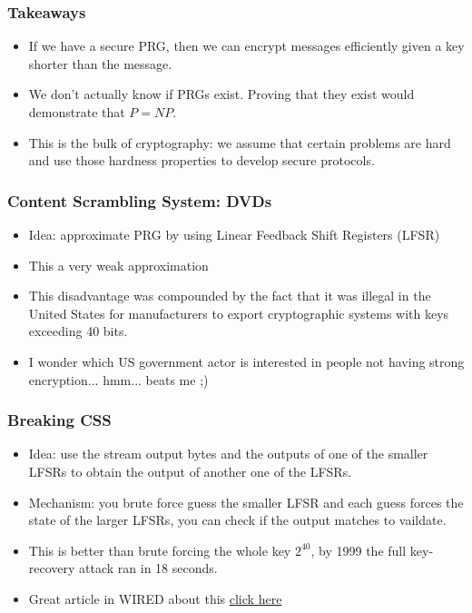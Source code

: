 \documentclass{beamer}
\begin{document}
\begin{frame}
\frametitle{Takeaways}
\begin{itemize}
    \item If we have a secure PRG, then we can encrypt messages efficiently given a key shorter than the message. \pause
    \item We don't actually know if PRGs exist. Proving that they exist would demonstrate that \(P = NP\).
    \item This is the bulk of cryptography: we assume that certain problems are hard and use those hardness properties to develop secure protocols.
\end{itemize}
\end{frame}

\begin{frame}
   \frametitle{Content Scrambling System: DVDs}
   \begin{itemize}
       \item Idea: approximate PRG by using Linear Feedback Shift Registers (LFSR) \pause
       \item This a very weak approximation \pause
       \item This disadvantage was compounded by the fact that it was illegal in the United States for manufacturers to export cryptographic systems with keys exceeding 40 bits. \pause
       \item I wonder which US government actor is interested in people not having strong encryption... hmm... beats me ;)
   \end{itemize}
\end{frame}

\begin{frame}
   \frametitle{Breaking CSS}
   \begin{itemize}
   \item Idea: use the stream output bytes and the outputs of one of the smaller LFSRs to obtain the output of another one of the LFSRs. \pause
   \item Mechanism: you brute force guess the smaller LFSR and each guess forces the state of the larger LFSRs, you can check if the output matches to vaildate. \pause
   \item This is better than brute forcing the whole key \(2^{40}\), \pause by 1999 the full key-recovery attack ran in 18 seconds. \pause
   \item Great article in WIRED about this \href{https://www.wired.com/1999/11/why-the-dvd-hack-was-a-cinch/}{click here}
   \end{itemize}
\end{frame}
\end{document}
